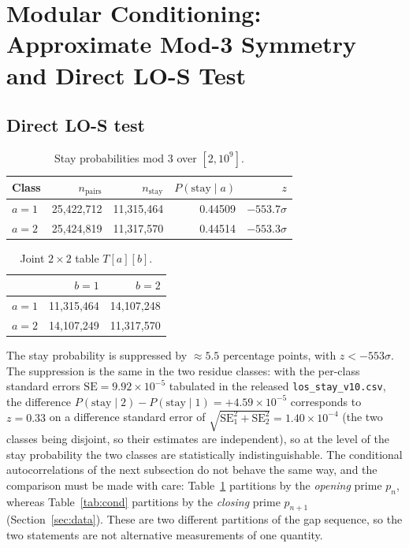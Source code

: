 \documentclass[11pt]{article}
\begin{document}
\section{Modular Conditioning: Approximate Mod-3 Symmetry and Direct
LO-S Test}
\label{sec:mod3}

\subsection{Direct LO-S test}
\begin{table}[H]\centering
\caption{Stay probabilities mod 3 over $[2, 10^9]$.}
\label{tab:los}
\begin{tabular}{lrrrr}
\toprule
Class & $n_{\text{pairs}}$ & $n_{\text{stay}}$ & $P(\text{stay}\mid a)$ & $z$ \\
\midrule
$a = 1$ & 25,422,712 & 11,315,464 & 0.44509 & $-553.7\sigma$ \\
$a = 2$ & 25,424,819 & 11,317,570 & 0.44514 & $-553.3\sigma$ \\
\bottomrule
\end{tabular}
\end{table}

\begin{table}[H]\centering
\caption{Joint $2 \times 2$ table $T[a][b]$.}
\label{tab:joint}
\begin{tabular}{lrr}
\toprule
       & $b = 1$    & $b = 2$    \\
\midrule
$a = 1$ & 11,315,464 & 14,107,248 \\
$a = 2$ & 14,107,249 & 11,317,570 \\
\bottomrule
\end{tabular}
\end{table}

The stay probability is suppressed by $\approx 5.5$ percentage points,
with $z < -553\sigma$. The suppression is the same in the two residue
classes: with the per-class standard errors
$\mathrm{SE} = 9.92 \times 10^{-5}$ tabulated in the released
\texttt{los\_stay\_v10.csv}, the difference
$P(\text{stay}\mid 2) - P(\text{stay}\mid 1) = +4.59 \times 10^{-5}$
corresponds to $z = 0.33$ on a difference standard error of
$\sqrt{\mathrm{SE}_1^2 + \mathrm{SE}_2^2} = 1.40 \times 10^{-4}$ (the two
classes being disjoint, so their estimates are independent), so at the
level of the stay probability the two
classes are statistically indistinguishable. The conditional
autocorrelations of the next subsection do not behave the same way, and
the comparison must be made with care: Table~\ref{tab:los} partitions
by the \emph{opening} prime $p_n$, whereas Table~\ref{tab:cond}
partitions by the \emph{closing} prime $p_{n+1}$
(Section~\ref{sec:data}). These are two different partitions of the gap
sequence, so the two statements are not alternative measurements of one
quantity.
\end{document}

